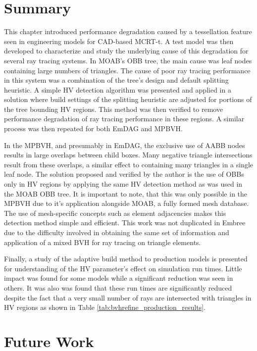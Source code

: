 \section{Summary}

This chapter introduced performance degradation caused by a tessellation feature
seen in engineering models for CAD-based MCRT-t. A test model was then
developed to characterize and study the underlying cause of this degradation for
several ray tracing systems. In MOAB's OBB tree, the main cause was leaf nodes
containing large numbers of triangles. The cause of poor ray tracing performance
in this system was a combination of the tree's design and default splitting
heuristic. A simple HV detection algorithm was presented and applied in a
solution where build settings of the splitting heuristic are adjusted for
portions of the tree bounding HV regions. This method was then verified to
remove performance degradation of ray tracing performance in these regions. A
similar process was then repeated for both EmDAG and MPBVH.

In the MPBVH, and presumably in EmDAG, the exclusive use of AABB nodes results
in large overlaps between child boxes. Many negative triangle intersections
result from these overlaps, a similar effect to containing many
triangles in a single leaf node. The solution proposed and verified by the
author is the use of OBBs only in HV regions by applying the same HV detection
method as was used in the MOAB OBB tree. It is important to note, that this was
only possible in the MPBVH due to it's application alongside MOAB, a fully
formed mesh database. The use of mesh-specific concepts such as element
adjacencies makes this detection method simple and efficient. This work was not
duplicated in Embree due to the difficulty involved in obtaining the same set of
information and application of a mixed BVH for ray tracing on triangle elements.

Finally, a study of the adaptive build method to production models is presented
for understanding of the HV parameter's effect on simulation run times. Little
impact was found for some models while a significant reduction was seen in
others. It was also was found that these run times are significantly reduced
despite the fact that a very small number of rays are intersected with triangles
in HV regions as shown in Table \ref{tab:bvhrefine_production_results}.

\section{Future Work}

